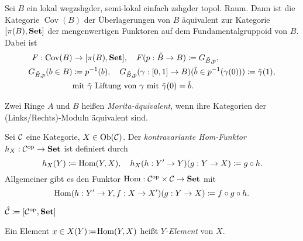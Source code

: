 \documentclass{cheat-sheet}
\DeclareMathOperator{\Cov}{Cov} %
\begin{document}

\begin{bsp}
  Sei $B$ ein lokal wegzshgder, semi-lokal einfach zshgder topol. Raum. Dann ist die Kategorie $\Cov(B)$ der Überlagerungen von $B$ äquivalent zur Kategorie $[\pi(B), \mathbf{Set}]$ der mengenwertigen Funktoren auf dem Fundamentalgruppoid von $B$. Dabei ist
  \begin{align*}
    F : \Cov(B) & \to [\pi(B), \SetC], \quad F(p : \tilde{B} \to B) \coloneqq G_{\tilde{B},p}, \\
    G_{\tilde{B},p}(b \in B) & \coloneqq p^{-1}(b), \quad G_{\tilde{B},p}(\gamma : \I \to B)(\tilde{b} \in p^{-1}(\gamma(0))) \coloneqq \tilde{\gamma}(1), \\
    & \text{mit $\tilde{\gamma}$ Liftung von $\gamma$ mit $\tilde{\gamma}(0) = \tilde{b}$}.
  \end{align*}
\end{bsp}



\begin{defn}
  Zwei Ringe $A$ und $B$ heißen \emph{Morita-äquivalent}, wenn ihre Kategorien der (Links/Rechts)-Moduln äquivalent sind.
\end{defn}


\begin{defn}
  Sei $\mathcal{C}$ eine Kategorie, $X \in \operatorname{Ob}(\mathcal{C})$. Der \emph{kontravariante Hom-Funktor} $h_X : \mathcal{C}^{\mathrm{op}} \to \mathbf{Set}$ ist definiert durch
  \[
    h_X(Y) \coloneqq \operatorname{Hom}(Y, X), \quad
    h_X(h : Y' \to Y)(g : Y \to X) \coloneqq g \circ h.
  \]
  Allgemeiner gibt es den Funktor $\operatorname{Hom} : \mathcal{C}^{\mathrm{op}} \times \mathcal{C} \to \mathbf{Set}$ mit
  \[
    \operatorname{Hom}(h : Y' \to Y, f : X \to X')(g : Y \to X) \coloneqq f \circ g \circ h.
  \]
\end{defn}

\begin{nota}
  $\hat{\mathcal{C}} \coloneqq [\mathcal{C}^{\mathrm{op}}, \mathbf{Set}]$
\end{nota}

\begin{defn}
  Ein Element $x \in X(Y) \!\coloneqq\! \operatorname{Hom}(Y, X)$ heißt \emph{$Y$-Element} von $X$.
\end{defn}
\end{document}
